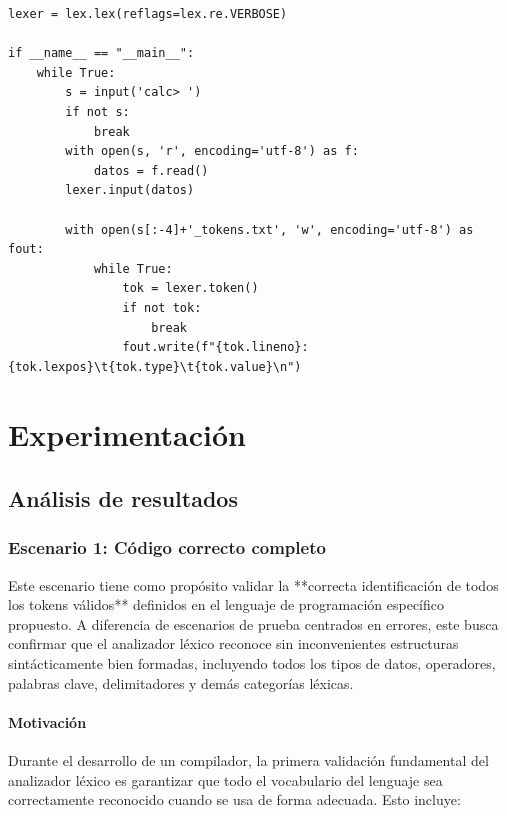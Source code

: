 \documentclass{article}
\begin{document}
\begin{lstlisting}[style=mypython]
lexer = lex.lex(reflags=lex.re.VERBOSE)

if __name__ == "__main__":
    while True:
        s = input('calc> ')
        if not s:
            break
        with open(s, 'r', encoding='utf-8') as f:
            datos = f.read()
        lexer.input(datos)

        with open(s[:-4]+'_tokens.txt', 'w', encoding='utf-8') as fout:
            while True:
                tok = lexer.token()
                if not tok:
                    break
                fout.write(f"{tok.lineno}:{tok.lexpos}\t{tok.type}\t{tok.value}\n")
\end{lstlisting}


\section{Experimentación}\label{sec:exp}

\subsection{Análisis de resultados}

\subsubsection{Escenario 1: Código correcto completo}

Este escenario tiene como propósito validar la **correcta identificación de todos los tokens válidos** definidos en el lenguaje de programación específico propuesto. A diferencia de escenarios de prueba centrados en errores, este busca confirmar que el analizador léxico reconoce sin inconvenientes estructuras sintácticamente bien formadas, incluyendo todos los tipos de datos, operadores, palabras clave, delimitadores y demás categorías léxicas.

\paragraph{Motivación}

Durante el desarrollo de un compilador, la primera validación fundamental del analizador léxico es garantizar que todo el vocabulario del lenguaje sea correctamente reconocido cuando se usa de forma adecuada. Esto incluye:
\end{document}
